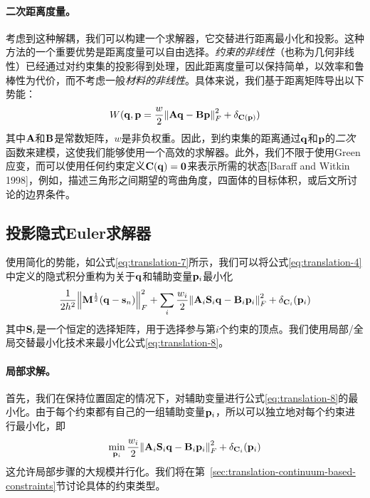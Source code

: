 \begin{translation}
\paragraph{二次距离度量。}

考虑到这种解耦，我们可以构建一个求解器，它交替进行距离最小化和投影。这种方法的一个重要优势是距离度量可以自由选择。\emph{约束的非线性}（也称为几何非线性）已经通过对约束集的投影得到处理，因此距离度量可以保持简单，以效率和鲁棒性为代价，而不考虑一般\emph{材料的非线性}。具体来说，我们基于距离矩阵导出以下势能：
\begin{equation}
  W(\vb{q}, \vb{p} = \frac{w}{2} \norm{\vb{A} \vb{q} - \vb{B} \vb{p}}_F^2 + \delta_{\vb{C}(\vb{p})})
  \label{eq:translation-7}
\end{equation}
其中$\vb{A}$和$\vb{B}$是常数矩阵，$w$是非负权重。因此，到约束集的距离通过$\vb{q}$和$\vb{p}$的\emph{二次}函数来建模，这使我们能够使用一个高效的求解器。此外，我们不限于使用Green应变，而可以使用任何约束定义$\vb{C}(\vb{q}) = \vb{0}$来表示所需的状态[Baraff and Witkin 1998]，例如，描述三角形之间期望的弯曲角度，四面体的目标体积，或后文所讨论的边界条件。

\subsection{投影隐式Euler求解器}

使用简化的势能，如公式\eqref{eq:translation-7}所示，我们可以将公式\eqref{eq:translation-4}中定义的隐式积分重构为关于$\vb{q}$和辅助变量$\vb{p}_i$最小化
\begin{equation}
  \frac{1}{2 h^2} \norm{\vb{M}^{\frac{1}{2}} (\vb{q} - \vb{s}_n)}_F^2 + \sum_i \frac{w_i}{2} \norm{\vb{A}_i \vb{S}_i \vb{q} - \vb{B}_i \vb{p}_i}_F^2 + \delta_{\vb{C}_i}(\vb{p}_i)
  \label{eq:translation-8}
\end{equation}
其中$\vb{S}_i$是一个恒定的选择矩阵，用于选择参与第$i$个约束的顶点。我们使用局部/全局交替最小化技术来最小化公式\eqref{eq:translation-8}。

\paragraph{局部求解。}

首先，我们在保持位置固定的情况下，对辅助变量进行公式\eqref{eq:translation-8}的最小化。由于每个约束都有自己的一组辅助变量$\vb{p}_i$，所以可以独立地对每个约束进行最小化，即
\begin{equation}
  \min_{\vb{p}_i} \frac{w_i}{2} \norm{\vb{A}_i \vb{S}_i \vb{q} - \vb{B}_i \vb{p}_i}_F^2 + \delta_{\vb{C}_i}(\vb{p}_i)
  \label{eq:translation-9}
\end{equation}
这允许局部步骤的大规模并行化。我们将在第~\ref{sec:translation-continuum-based-constraints}节讨论具体的约束类型。


\end{translation}
